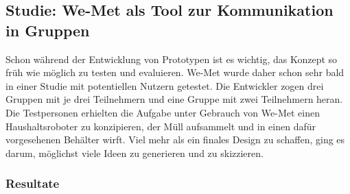 \subsection{Studie: We-Met als Tool zur Kommunikation in Gruppen}
Schon während der Entwicklung von Prototypen ist es wichtig, das Konzept so früh wie möglich zu testen und evaluieren. We-Met wurde daher schon sehr bald in einer Studie mit potentiellen Nutzern getestet. Die Entwickler zogen drei Gruppen mit je drei Teilnehmern und eine Gruppe mit zwei Teilnehmern heran. Die Testpersonen erhielten die Aufgabe unter Gebrauch von We-Met einen Haushaltsroboter zu konzipieren, der Müll aufsammelt und in einen dafür vorgesehenen Behälter wirft. Viel mehr als ein finales Design zu schaffen, ging es darum, möglichst viele Ideen zu generieren und zu skizzieren.

\subsubsection{Resultate}
